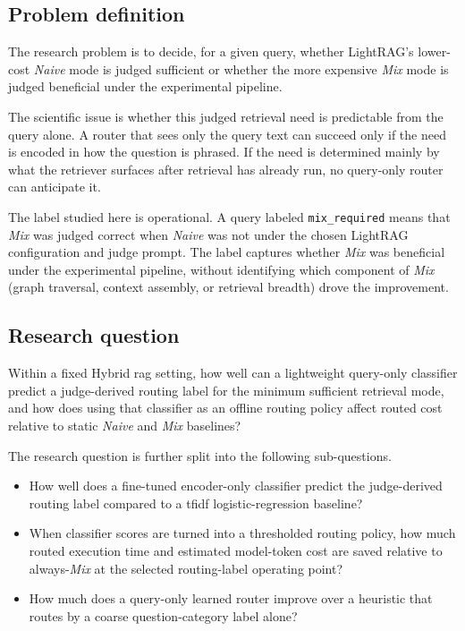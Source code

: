 \documentclass[english, bibtex]{kththesis}               %
\numberwithin{listing}{chapter}
\begin{document}
\subsection{Problem definition}
\label{sec:problemDefinition}

The research problem is to decide, for a given query, whether LightRAG's lower-cost \emph{Naive} mode is judged sufficient or whether the more expensive \emph{Mix} mode is judged beneficial under the experimental pipeline.

The scientific issue is whether this judged retrieval need is predictable from the query alone. A router that sees only the query text can succeed only if the need is encoded in how the question is phrased. If the need is determined mainly by what the retriever surfaces after retrieval has already run, no query-only router can anticipate it.

The label studied here is operational. A query labeled \texttt{mix\_required} means that \emph{Mix} was judged correct when \emph{Naive} was not under the chosen LightRAG configuration and judge prompt. The label captures whether \emph{Mix} was beneficial under the experimental pipeline, without identifying which component of \emph{Mix} (graph traversal, context assembly, or retrieval breadth) drove the improvement.

\subsection{Research question}
\label{sec:researchQuestion}

Within a fixed Hybrid \gls{rag} setting, how well can a lightweight query-only classifier predict a judge-derived routing label for the minimum sufficient retrieval mode, and how does using that classifier as an offline routing policy affect routed cost relative to static \emph{Naive} and \emph{Mix} baselines?

The research question is further split into the following sub-questions.

\begin{itemize}
    \item How well does a fine-tuned encoder-only classifier predict the judge-derived routing label compared to a \gls{tfidf} logistic-regression baseline?
    \item When classifier scores are turned into a thresholded routing policy, how much routed execution time and estimated model-token cost are saved relative to always-\emph{Mix} at the selected routing-label operating point?
    \item How much does a query-only learned router improve over a heuristic that routes by a coarse question-category label alone?
\end{itemize}
\end{document}
